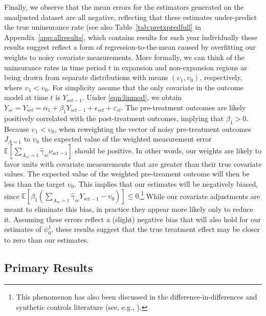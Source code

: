 \documentclass[aoas]{imsart}
\theoremstyle{plain}
\theoremstyle{remark}
\begin{document}
Finally, we observe that the mean errors for the estimators generated on the unadjusted dataset are all negative, reflecting that these estimates under-predict the true uninsurance rate (see also Table~\ref{tab:pretxpredfull} in Appendix~\ref{app:allresults}, which contains results for each year individually these results suggest reflect a form of regression-to-the-mean caused by overfitting our weights to noisy covariate measurements. More formally, we can think of the uninsurance rates in time period $t$ in expansion and non-expansion regions as being drawn from separate distributions with means $(\upsilon_1, \upsilon_0)$, respectively, where $\upsilon_1 < \upsilon_0$. For simplicity assume that the only covariate in the outcome model at time $t$ is $Y_{sct-1}$. Under \eqref{eqn:linmod}, we obtain $Y_{sc} = Y_{sct} = \alpha_1 + \beta_1Y_{sct-1} + \epsilon_{sct} + \varepsilon_{st}$. The pre-treatment outcomes are likely positively correlated with the post-treatment outcomes, implying that $\beta_1 > 0$. Because $\upsilon_1 < \upsilon_0$, when reweighting the vector of noisy pre-treatment outcomes $J_{A=1}$ to $\upsilon_0$ the expected value of the weighted measurement error $\mathbb{E}[\sum_{A_{sc} = 1}\hat{\gamma}_{sc}\nu_{sct-1}]$ should be positive. In other words, our weights are likely to favor units with covariate measurements that are greater than their true covariate values. The expected value of the weighted pre-treament outcome will then be less than the target $\upsilon_0$. This implies that our estimates will be negatively biased, since $\mathbb{E}[\beta_1(\sum_{A_{sc} = 1}\hat{\gamma}_{sc}Y_{sct-1} - \upsilon_0)] \le 0$.\footnote{This phenomenon has also been discussed in the difference-in-differences and synthetic controls literature (see, e.g., \cite{daw2018matching}).} While our covariate adjustments are meant to eliminate this bias, in practice they appear more likely only to reduce it. Assuming these errors reflect a (slight) negative bias that will also hold for our estimates of $\psi^1_0$, these results suggest that the true treatment effect may be closer to zero than our estimates. 

\subsection{Primary Results}
\end{document}
